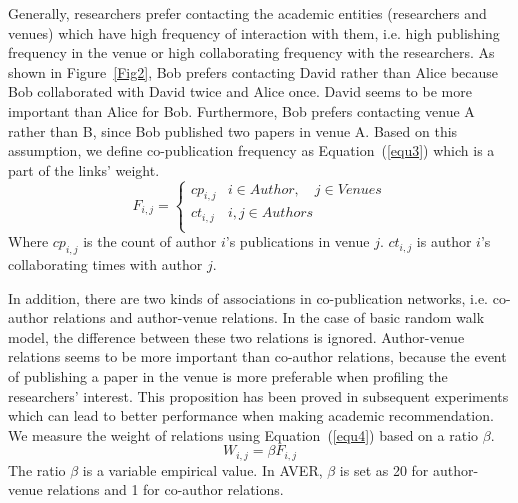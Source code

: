 \documentclass{sig-alternate-2013}
\begin{document}
Generally, researchers prefer contacting the academic entities (researchers and venues) which have high frequency of interaction with them, i.e. high publishing frequency in the venue or high collaborating frequency with the researchers. As shown in Figure~\ref{Fig2}, Bob prefers contacting David rather than Alice because Bob collaborated with David twice and Alice once. David seems to be more important than Alice for Bob. Furthermore, Bob prefers contacting venue A rather than B, since Bob published two papers in venue A. Based on this assumption, we define co-publication frequency as Equation~(\ref{equ3}) which is a part of the links' weight.
\begin{equation}
\label{equ3}
F_{i,j}=\left\{\begin{array}{ll}
cp_{i,j} & i\in Author,\quad j\in Venues\\
ct_{i,j} & i,j\in Authors\\
\end{array}\right.
\end{equation}
Where $cp_{i,j}$ is the count of author $i$'s publications in venue $j$. $ct_{i,j}$ is author $i$'s collaborating times with author $j$.

In addition, there are two kinds of associations in co-publication networks, i.e. co-author relations and author-venue relations. In the case of basic random walk model, the difference between these two relations is ignored. Author-venue relations seems to be more important than co-author relations, because the event of publishing a paper in the venue is more preferable when profiling the researchers' interest. This proposition has been proved in subsequent experiments which can lead to better performance when making academic recommendation. We measure the weight of relations using Equation~(\ref{equ4}) based on a ratio $\beta$.
\begin{equation}
\label{equ4}
W_{i,j}=\beta F_{i,j}
\end{equation}
The ratio $\beta$ is a variable empirical value. In AVER, $\beta$ is set as 20 for author-venue relations and 1 for co-author relations.
\end{document}
